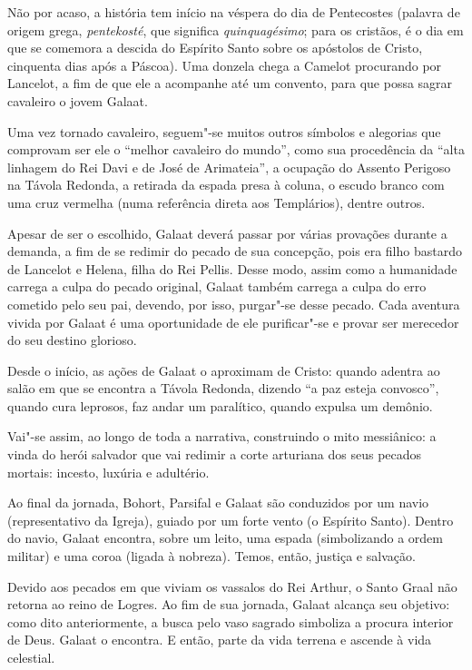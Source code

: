 \documentclass[11pt]{extarticle}
\begin{document}
Não por acaso, a história tem início na véspera
do dia de Pentecostes (palavra de origem grega, \emph{pentekosté}, que
significa \emph{quinquagésimo}; para os cristãos, é o dia em que se
comemora a descida do Espírito Santo sobre os apóstolos de Cristo,
cinquenta dias após a Páscoa). Uma donzela chega a Camelot procurando
por Lancelot, a fim de que ele a acompanhe até um convento, para que
possa sagrar cavaleiro o jovem
Galaat.

Uma vez tornado cavaleiro, seguem"-se muitos outros símbolos e
alegorias que comprovam ser ele o ``melhor cavaleiro do mundo'', como
sua procedência da ``alta linhagem do Rei Davi e de José de Arimateia'',
a ocupação do Assento Perigoso na Távola Redonda, a retirada da espada
presa à coluna, o escudo branco com uma cruz vermelha (numa referência
direta aos Templários), dentre outros.

Apesar de ser o escolhido, Galaat deverá passar por várias
provações durante a demanda, a fim de se redimir do pecado de sua
concepção, pois era filho bastardo de Lancelot e Helena, filha do Rei
Pellis. Desse modo, assim como a humanidade carrega a culpa do pecado
original, Galaat também carrega a culpa do erro cometido pelo seu pai,
devendo, por isso, purgar"-se desse pecado. Cada aventura vivida por
Galaat é uma oportunidade de ele purificar"-se e provar ser merecedor do
seu destino glorioso.

Desde o início, as ações de Galaat o aproximam de Cristo:
quando adentra ao salão em que se encontra a Távola Redonda, dizendo ``a
paz esteja convosco'', quando cura leprosos, faz andar um paralítico,
quando expulsa um demônio.

Vai"-se assim, ao longo de toda a narrativa, construindo o mito
messiânico: a vinda do herói salvador que vai redimir a corte arturiana
dos seus pecados mortais: incesto, luxúria e
adultério.

Ao final da jornada, Bohort, Parsifal e Galaat são conduzidos
por um navio (representativo da Igreja), guiado por um forte vento (o
Espírito Santo). Dentro do navio, Galaat encontra, sobre um leito, uma
espada (simbolizando a ordem militar) e uma coroa (ligada à nobreza).
Temos, então, justiça e
salvação.

Devido aos pecados em que viviam os vassalos do Rei Arthur, o
Santo Graal não retorna ao reino de Logres. Ao fim de sua jornada,
Galaat alcança seu objetivo: como dito anteriormente, a busca pelo vaso
sagrado simboliza a procura interior de Deus. Galaat o encontra. E
então, parte da vida terrena e ascende à vida
celestial.
\end{document}
